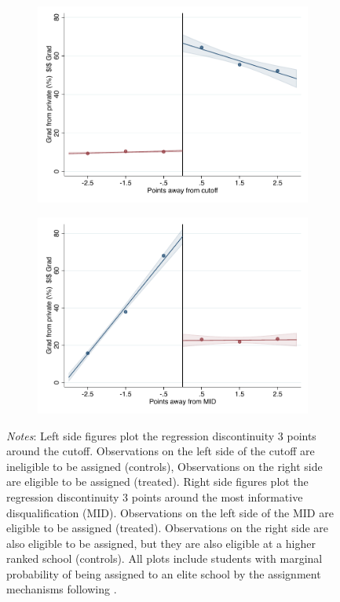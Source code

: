 \documentclass[oneside,11pt]{article}
\begin{document}
\begin{figure}[H]
\begin{center}
    \begin{subfigure}{0.475\textwidth}
        \centering
        \includegraphics[width=\textwidth]{04_Figures/rd_plot_tau_ENLACE_Privado_UNAM3.pdf}
    \end{subfigure}
    \begin{subfigure}{0.475\textwidth}
        \centering
        \includegraphics[width=\textwidth]{04_Figures/rd_plot_mid_ENLACE_Privado_UNAM3.pdf}
    \end{subfigure}
    \end{center}
    
\footnotesize
\textit{Notes}: Left side figures plot the regression discontinuity 3 points around the cutoff. Observations on the left side of the cutoff are ineligible to be assigned (controls), Observations on the right side are eligible to be assigned (treated). Right side figures plot the regression discontinuity 3 points around the most informative disqualification (MID). Observations on the left side of the MID are eligible to be assigned (treated). Observations on the right side are also eligible to be assigned, but they are also eligible at a higher ranked school (controls). All plots include students with marginal probability of being assigned to an elite school by the assignment mechanisms following \citet{abdulkadirouglu2022breaking}. 
\end{figure}
\end{document}
